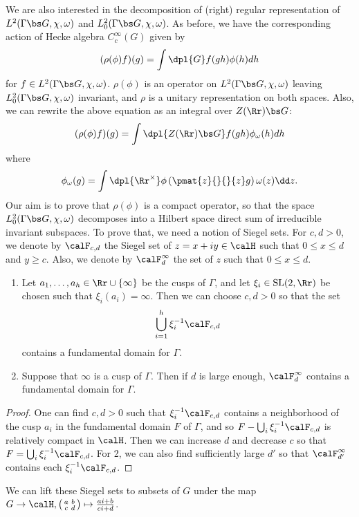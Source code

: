 We are also interested in the decomposition of (right) regular representation of $L^{2}(\Gamma \bs G, \chi, \omega)$ and $L_{0}^{2}(\Gamma \bs G, \chi, \omega)$. 
As before, we have the corresponding action of Hecke algebra $C_{c}^{\infty}(G)$ given by 
$$
(\rho(\phi)f)(g) = \int\dpl{G} f(gh)\phi(h)dh
$$
for $f\in L^{2}(\Gamma \bs G, \chi, \omega)$. 
$\rho(\phi)$ is an operator on $L^{2}(\Gamma \bs G,\chi, \omega)$ leaving $L^{2}_{0}(\Gamma \bs G, \chi, \omega)$ invariant, and $\rho$ is a unitary representation on both spaces. 
Also, we can rewrite the above equation as an integral over $Z(\Rr)\bs G$:
$$
(\rho(\phi)f)(g) = \int\dpl{Z(\Rr)\bs G} f(gh)\phi_{\omega}(h) dh
$$
where 
$$
\phi_{\omega}(g) = \int\dpl{\Rr^{\times}} \phi\left( \pmat{z}{}{}{z} g\right) \omega(z)\dd z.
$$
Our aim is to prove that $\rho(\phi)$ is a compact operator, so that the space $L^{2}_{0}(\Gamma \bs G, \chi, \omega)$ decomposes into a Hilbert space direct sum of irreducible invariant subspaces. 
To prove that, we need a notion of Siegel sets. 
For $c, d>0$, we denote by $\calF_{c, d}$ the Siegel set of $z = x+iy\in \calH$ such that $0\leq x\leq d$ and $y\geq c$. 
Also, we denote by $\calF_{d}^{\infty}$ the set of $z$ such that $0\leq x\leq d$. 
\begin{proposition}
\label{siegel}
\begin{enumerate}
\item Let $a_{1}, \dots, a_{h}\in \Rr\cup \{\infty\}$ be the cusps of $\Gamma$, and let $\xi_{i}\in \SL(2, \Rr)$ be chosen such that $\xi_{i}(a_{i}) = \infty$. 
Then we can choose $c, d>0$ so that the set 
$$
\bigcup_{i = 1}^{h} \xi_{i}^{-1}\calF_{c, d}
$$
contains a fundamental domain for $\Gamma$. 
\item Suppose that $\infty$ is a cusp of $\Gamma$. Then if $d$ is large enough, $\calF_{d}^{\infty}$ contains a fundamental domain for $\Gamma$. 
\end{enumerate}
\end{proposition}
\begin{proof}
One can find $c, d>0$ such that $\xi_{i}^{-1}\calF_{c, d}$ contains a neighborhood of the cusp $a_i$ in the fundamental domain $F$ of $\Gamma$, and so $F - \bigcup_{i} \xi_{i}^{-1}\calF_{c, d}$ is relatively compact in $\calH$. 
Then we can increase $d$ and decrease $c$ so that $F = \bigcup_{i} \xi_{i}^{-1} \calF_{c, d}$. 
For 2, we can also find sufficiently large $d'$ so that $\calF_{d'}^{\infty}$ contains each $\xi_{i}^{-1}\calF_{c, d}$. 
\end{proof}
We can lift these Siegel sets to subsets of $G$ under the map $G\to \calH, \smat{a}{b}{c}{d}\mapsto \frac{ai+b}{ci+d}$. 
